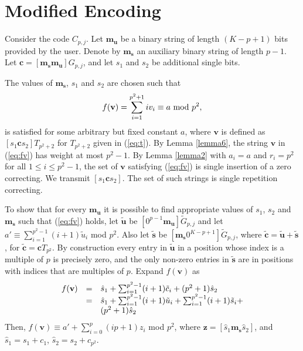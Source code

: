 \section{Modified Encoding}\label{enc}
Consider the code $C_{p,j}$. Let $\mathbf{m_u}$ be a binary string
of length $(K-p+1)$ bits provided by the user. Denote by
$\mathbf{m_s}$ an auxiliary binary string of length $p-1$. Let
$\mathbf{c}= [\mathbf{m_s} \mathbf{m_u}]{G}_{p,j}$, and let $s_1$
and $s_2$ be additional single bits.


The values of $\mathbf{m_s}$, $s_1$ and $s_2$ are chosen such that
\vspace{-0.1in}\begin{equation}\label{eq:fv}
\vspace{-0.1in}f(\mathbf{v})=\sum_{i=1}^{p^2+1}iv_i \equiv a
\text{ mod }p^2,
\end{equation}
is satisfied for some arbitrary but fixed constant $a$, where
$\mathbf{v}$ is defined as $[s_1 \mathbf{c} s_2]T_{p^2+2}$ for
$T_{p^2+2}$ given in (\ref{eq:t}). By Lemma \ref{lemma6}, the
string $\mathbf{v}$ in (\ref{eq:fv}) has weight at most $p^2-1$.
By Lemma \ref{lemma2} with $a_i =a$ and $r_i = p^2$ for all $1 \le
i \le p^2 - 1$, the set of $\mathbf{v}$ satisfying (\ref{eq:fv})
is single insertion of a zero correcting. We transmit $[s_1
\mathbf{c} s_2]$. The set of such strings is single repetition
correcting.


To show that for every $\mathbf{m_u}$ it is possible to find
appropriate values of $s_1$, $s_2$ and $\mathbf{m_s}$ such that
(\ref{eq:fv}) holds, let $\mathbf{\tilde{u}}$ be $[0^{p-1}
\mathbf{m_u}]\tilde{G}_{p,j}$ and let $a'\equiv \sum_{i=1}^{p^2-1}
(i+1)\tilde{u}_i$ mod $p^2$. Also let $\mathbf{\tilde{s}}$ be
$[\mathbf{m_s}0^{K-p+1}]\tilde{G}_{p,j}$, where
$\mathbf{\tilde{c}}=\mathbf{\tilde{u}}+\mathbf{\tilde{s}}$, for
$\mathbf{\tilde{c}}=\mathbf{c}T_{p^2}$. By construction every
entry in $\mathbf{\tilde{u}}$ in a position whose index is a
multiple of $p$ is precisely zero, and the only non-zero entries
in $\mathbf{\tilde{s}}$ are in positions with indices that are
multiples of $p$. Expand $f(\mathbf{v})$ as
\vspace{-0.15in}\begin{equation}\label{fv}
\begin{array}{lll}
f(\mathbf{v})&= & \hat{s}_1 + \sum_{i=1}^{p^2-1}(i+1)\tilde{c}_i +(p^2+1)\hat{s}_2\\
{} &= &\hat{s}_1  + \sum_{i=1}^{p^2-1}(i+1)\tilde{u}_i +
\sum_{i=1}^{p^2-1}(i+1)\tilde{s}_i +\\
{} & {}& (p^2+1)\hat{s}_2
\end{array}
\vspace{0.01in}\end{equation}%
Then, $f(\mathbf{v}) \equiv a'+\sum_{i=0}^p (ip+1) z_i$ mod $p^2$,
where $\mathbf{z}=[\hat{s}_1 \mathbf{m_s} \hat{s}_2]$, and
$\hat{s}_1=s_1+c_1$, $\hat{s}_2=s_2+c_{p^2}$.

